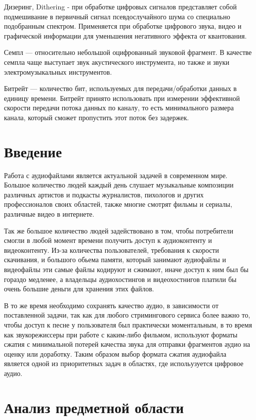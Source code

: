 \documentclass[12pt,a4paper,oneside]{report}
\begin{document}
Дизеринг, Dithering - при обработке цифровых сигналов представляет собой подмешивание в первичный сигнал псевдослучайного шума со специально подобранным спектром. Применяется при обработке цифрового звука, видео и графической информации для уменьшения негативного эффекта от квантования.

Семпл — относительно небольшой оцифрованный звуковой фрагмент. В качестве семпла чаще выступает звук акустического инструмента, но также и звуки электромузыкальных инструментов.

Битрейт  — количество бит, используемых для передачи/обработки данных в единицу времени. Битрейт принято использовать при измерении эффективной скорости передачи потока данных по каналу, то есть минимального размера канала, который сможет пропустить этот поток без задержек.
\clearpage

\chapter*{Введение}
\quad
Работа с аудиофайлами является актуальной задачей в современном мире. Большое количество людей каждый день слушает музыкальные композиции различных артистов и подкасты журналистов, пихологов и других профессионалов своих областей, также многие смотрят фильмы и сериалы, различные видео в интернете.
\quad

Так же большое количество людей задействовано в том, чтобы потребители смогли в любой момент времени получить доступ к аудиоконтенту и видеоконтенту. Из-за количества пользователей, требования к скорости скачивания, и большого обьема памяти, который занимают аудиофайлы и видеофайлы эти самые файлы кодируют и сжимают, иначе доступ к ним был бы гораздо медленее, а владельцы аудиохостингов и видеохостнигов платили бы очень большие деньги для хранения этих файлов.
\quad

В то же время необходимо сохранять качество аудио, в зависимости от поставленной задачи, так как для любого стримингового сервиса более важно то, чтобы доступ к песне у пользователя был практически моментальным, в то время как звукорежиссеры при работе с каким-либо фильмом, используют форматы сжатия с минимальной потерей качества звука для отправки фрагментов аудио на оценку или доработку. Таким образом выбор формата сжатия аудиофайла является одной из приоритетных задач в областях, где испольузуется цифровое аудио.
\clearpage


\chapter{Анализ предметной области}
\end{document}
